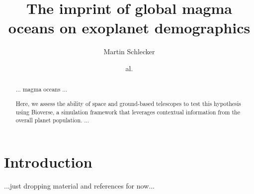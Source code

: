 \documentclass[twocolumn]{aastex631}
\begin{document}
\title{The imprint of global magma oceans on exoplanet demographics}

\author[0000-0001-8355-2107]{Martin Schlecker}
\author{al.}


\begin{abstract}
    $\ldots$ magma oceans $\ldots$

    Here, we assess the ability of space and ground-based telescopes to test this hypothesis using Bioverse, a simulation framework that leverages contextual information from the overall planet population.
    $\ldots$

\end{abstract}

\section{Introduction}
...just dropping material and references for now...
\end{document}

